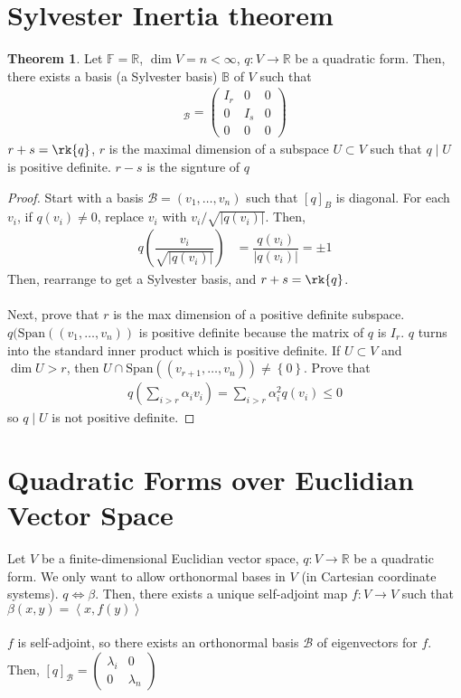 \documentclass[letterpaper,12pt]{article}
\theoremstyle{definition}
\newtheorem*{theorem}{Theorem}
\newcommand{\abs}[1]{\left\lvert #1 \right\rvert}
\newcommand{\set}[1]{\left\{ #1 \right\}}
\newcommand{\Span}[1]{\text{Span}\left(#1 \right)}
\newcommand{\inp}[2]{\left< #1, #2 \right>}
\begin{document}
\section*{Sylvester Inertia theorem}
\begin{theorem}
Let $\mathbb{F} = \mathbb{R}$, $\dim{V} = n < \infty$, $q: V \rightarrow \mathbb{R}$ be a quadratic form. Then, there exists a basis (a Sylvester basis) $\mathbb{B}$ of $V$ such that
\begin{align*}
    [q]_{\mathcal{B}} = \begin{pmatrix} I_r & 0 & 0 \\ 0 & I_s & 0 \\ 0 & 0 & 0 \end{pmatrix}
\end{align*}
$r+s = \rk{q}$, $r$ is the maximal dimension of a subspace $U \subset V$ such that $q \mid U$ is positive definite. $r-s$ is the signture of $q$
\end{theorem}
\begin{proof}
Start with a basis $\mathcal{B} = (v_1, \dots, v_n)$ such that $[q]_{B}$ is diagonal. For each $v_i$, if $q(v_i) \neq 0$, replace $v_i$ with $v_i/\sqrt{\abs{q(v_i)}}$. Then,
\begin{align*}
    q \left( \dfrac{v_i}{\sqrt{\abs{q(v_i)}}} \right) & = \dfrac{q(v_i)}{\abs{q(v_i)}} = \pm 1
\end{align*}
Then, rearrange to get a Sylvester basis, and $r+s = \rk{q}$.
\\ \\ Next, prove that $r$ is the max dimension of a positive definite subspace. $q(\Span{(v_1, \dots, v_n)}$ is positive definite because the matrix of $q$ is $I_r$. $q$ turns into the standard inner product which is positive definite. If $U \subset V$ and $\dim{U} > r$, then $U \cap \Span{(v_{r+1}, \dots, v_n)} \neq \set{0}$. Prove that
\begin{align*}
    q \left( \sum_{i > r} \alpha_i v_i \right) = \sum_{i > r} \alpha_{i}^{2} q(v_i) \leq 0
\end{align*}
so $q \mid U$ is not positive definite.
\end{proof}

\section*{Quadratic Forms over Euclidian Vector Space}
Let $V$ be a finite-dimensional Euclidian vector space, $q: V \rightarrow \mathbb{R}$ be a quadratic form. We only want to allow orthonormal bases in $V$ (in Cartesian coordinate systems). $q \iff \beta$. Then, there exists a unique self-adjoint map $f: V \rightarrow V$ such that $\beta(x,y) = \inp{x}{f(y)}$
\\ \\ $f$ is self-adjoint, so there exists an orthonormal basis $\mathcal{B}$ of eigenvectors for $f$. Then, $[q]_{\mathcal{B}} = \begin{pmatrix} \lambda_i & 0 \\ 0 & \lambda_n \end{pmatrix}$
\end{document}
